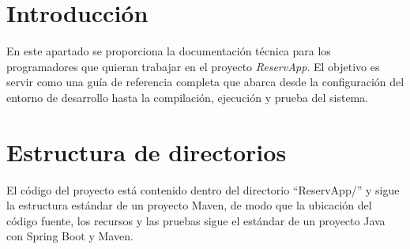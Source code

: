 
\section{Introducción}
En este apartado se proporciona la documentación técnica para los programadores que quieran trabajar en el proyecto \textit{ReservApp}. El objetivo es servir como una guía de referencia completa que abarca desde la configuración del entorno de desarrollo hasta la compilación, ejecución y prueba del sistema.

\section{Estructura de directorios}
El código del proyecto está contenido dentro del directorio ``ReservApp/'' y sigue la estructura estándar de un proyecto Maven, de modo que la ubicación del código fuente, los recursos y las pruebas sigue el estándar de un proyecto Java con Spring Boot y Maven.


